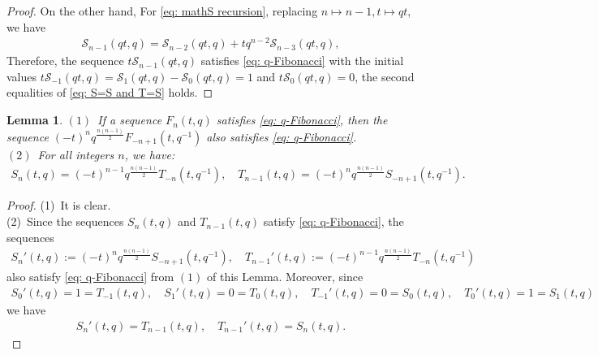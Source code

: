 \documentclass[a4paper]{article}
\numberwithin{equation}{section}
\theoremstyle{plain}
\newtheorem{lem}{Lemma}
\begin{document}
\begin{appendices}
\begin{proof}
On the other hand, For \eqref{eq: mathS recursion}, replacing $n\mapsto n-1, t\mapsto qt$, we have 
\begin{align*}
\mathcal{S}_{n-1}(qt,q)=\mathcal{S}_{n-2}(qt,q)+t q^{n-2}\mathcal{S}_{n-3}(qt,q), 
\end{align*}
Therefore, the sequence $t\mathcal{S}_{n-1}(qt,q)$ satisfies \eqref{eq: q-Fibonacci} with the initial values $t\mathcal{S}_{-1}(qt,q)=\mathcal{S}_{1}(qt,q)-\mathcal{S}_{0}(qt,q)=1$ and $t\mathcal{S}_{0}(qt,q)=0$, the second equalities of \eqref{eq: S=S and T=S} holds. 
\end{proof}
\begin{lem}
\label{lem: q-Fibonacci}
$(1)$\ If a sequence $F_n(t,q)$ satisfies \eqref{eq: q-Fibonacci}, then the sequence $(-t)^nq^\frac{n(n-1)}{2}F_{-n+1}\left(t,q^{-1}\right)$ also satisfies \eqref{eq: q-Fibonacci}. \\
$(2)$\ For all integers $n$, we have: 
\begin{align*}
S_n(t,q)=(-t)^{n-1}q^\frac{n(n-1)}{2}T_{-n}\left(t,q^{-1}\right),\quad T_{n-1}(t,q)=(-t)^{n}q^\frac{n(n-1)}{2}S_{-n+1}\left(t,q^{-1}\right). 
\end{align*}
\end{lem}
\begin{proof}
(1)\ It is clear. \\
(2)\ 
Since the sequences $S_n(t,q)$ and $T_{n-1}(t,q)$ satisfy \eqref{eq: q-Fibonacci}, the sequences 
\begin{align*}
S_n'(t,q):=(-t)^{n}q^\frac{n(n-1)}{2}S_{-n+1}\left(t,q^{-1}\right),\quad T_{n-1}'(t,q):=(-t)^{n-1}q^\frac{n(n-1)}{2}T_{-n}\left(t,q^{-1}\right)
\end{align*}
also satisfy \eqref{eq: q-Fibonacci} from $(1)$ of this Lemma. 
Moreover, since 
\begin{align*}
S_0'(t,q)=1=T_{-1}(t,q), \quad S_1'(t,q)=0=T_0(t,q),\quad T_{-1}'(t,q)=0=S_0(t,q), \quad T_{0}'(t,q)=1=S_1(t,q)
\end{align*}
we have
\begin{align*}
S_n'(t,q)=T_{n-1}(t,q),\quad T_{n-1}'(t,q)=S_n(t,q). 
\end{align*}
\end{proof}


\end{appendices}
\end{document}
